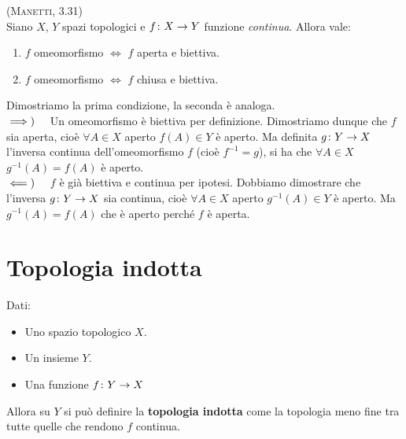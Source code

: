 \begin{lemming}\textsc{(Manetti, 3.31)}\\
Siano $X$, $Y$ spazi topologici e $f\colon X\rightarrow Y$ funzione \textit{continua}. Allora vale:
\begin{enumerate}
\item $f$ omeomorfismo $\iff$ $f$ aperta e biettiva.
\item $f$ omeomorfismo $\iff$ $f$ chiusa e biettiva.
\end{enumerate}
\end{lemming}
\begin{demonstration}
Dimostriamo la prima condizione, la seconda è analoga.\\
$\implies)\quad$ Un omeomorfismo è biettiva per definizione. Dimostriamo dunque che $f$ sia aperta, cioè $\forall A\in X$ aperto $f\left(A\right)\in Y$ è aperto. Ma definita $g\colon Y\rightarrow X$ l'inversa continua dell'omeomorfismo $f$ (cioè $f^{-1}=g$), si ha che $\forall A\in X$ $g^{-1}\left(A\right)=f\left(A\right)$ è aperto.\\
$\impliedby)\quad$ $f$ è già biettiva e continua per ipotesi. Dobbiamo dimostrare che l'inversa $g\colon Y\rightarrow X$ sia continua, cioè $\forall A\in X$ aperto $g^{-1}\left(A\right)\in Y$ è aperto. Ma $g^{-1}\left(A\right)=f\left(A\right)$ che è aperto perché $f$ è aperta.
\end{demonstration}
\section{Topologia indotta}
\begin{define}
Dati:
\begin{itemize}
\item Uno spazio topologico $X$.
\item Un insieme $Y$.
\item Una funzione $f\colon Y\rightarrow X$
\end{itemize}
Allora su $Y$ si può definire la \textbf{topologia indotta} come la topologia meno fine tra tutte quelle che rendono $f$ continua.
\end{define}
